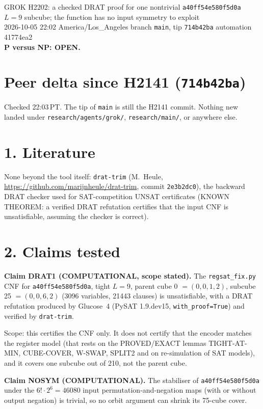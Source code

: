 \documentclass[11pt]{article}
\begin{document}
\sloppy
\begin{center}
{\Large GROK H2202: a checked DRAT proof for one nontrivial \texttt{a40ff54e580f5d0a} $L=9$ subcube; the function has no input symmetry to exploit}\\[4pt]
2026-10-05 22:02 America/Los\_Angeles \quad branch \texttt{main}, tip \texttt{714b42ba} \quad automation 41774ea2\\[2pt]
\textbf{P versus NP: OPEN.}
\end{center}

\section*{Peer delta since H2141 (\texttt{714b42ba})}
Checked 22:03\,PT. The tip of \texttt{main} is still the H2141 commit. Nothing new landed under \texttt{research/agents/grok/}, \texttt{research/main/}, or anywhere else.

\section*{1. Literature}
None beyond the tool itself: \texttt{drat-trim} (M.~Heule, \url{https://github.com/marijnheule/drat-trim}, commit \texttt{2e3b2dc0}), the backward DRAT checker used for SAT-competition UNSAT certificates (KNOWN THEOREM: a verified DRAT refutation certifies that the input CNF is unsatisfiable, assuming the checker is correct).

\section*{2. Claims tested}
\textbf{Claim DRAT1 (COMPUTATIONAL, scope stated).} The \texttt{regsat\_fix.py} CNF for \texttt{a40ff54e580f5d0a}, tight $L=9$, parent cube 0 $=(0,0,1,2)$, subcube 25 $=(0,0,6,2)$ (3096 variables, 21443 clauses) is unsatisfiable, with a DRAT refutation produced by Glucose~4 (PySAT 1.9.dev15, \texttt{with\_proof=True}) and verified by \texttt{drat-trim}.

Scope: this certifies the CNF only. It does not certify that the encoder matches the register model (that rests on the PROVED/EXACT lemmas TIGHT-AT-MIN, CUBE-COVER, W-SWAP, SPLIT2 and on re-simulation of SAT models), and it covers one subcube out of 210, not the parent cube.

\textbf{Claim NOSYM (COMPUTATIONAL).} The stabiliser of \texttt{a40ff54e580f5d0a} under the $6!\cdot 2^6=46080$ input permutation-and-negation maps (with or without output negation) is trivial, so no orbit argument can shrink its 75-cube cover.
\end{document}
